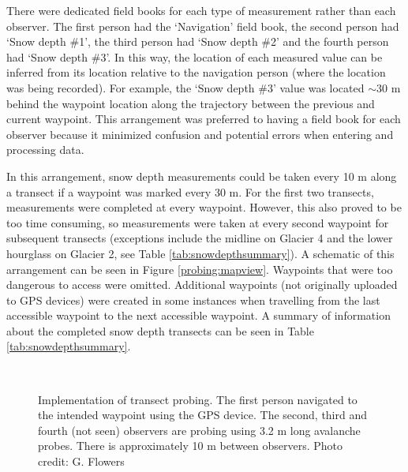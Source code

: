 \documentclass{sfuthesis}
\begin{document}
There were dedicated field books for each type of measurement rather than each observer. The first person had the `Navigation' field book, the second person had `Snow depth \#1', the third person had `Snow depth \#2' and the fourth person had `Snow depth \#3'. In this way, the location of each measured value can be inferred from its location relative to the navigation person (where the location was being recorded). For example, the `Snow depth \#3' value was located $\sim$30 m behind the waypoint location along the trajectory between the previous and current waypoint. This arrangement was preferred to having a field book for each observer because it minimized confusion and potential errors when entering and processing data.

In this arrangement, snow depth measurements could be taken every 10 m along a transect if a waypoint was marked every 30 m. For the first two transects, measurements were completed at every waypoint. However, this also proved to be too time consuming, so measurements were taken at every second waypoint for subsequent transects (exceptions include the midline on Glacier 4 and the lower hourglass on Glacier 2, see Table \ref{tab:snowdepthsummary}). A schematic of this arrangement can be seen in Figure \ref{probing:mapview}. Waypoints that were too dangerous to access were omitted. Additional waypoints (not originally uploaded to GPS devices) were created in some instances when travelling from the last accessible waypoint to the next accessible waypoint. A summary of information about the completed snow depth transects can be seen in Table \ref{tab:snowdepthsummary}.

\begin{figure}[H]
	\centering
	\\
	\caption{Implementation of transect probing. The first person navigated to the intended waypoint using the GPS device. The second, third and fourth (not seen) observers are probing using 3.2 m long avalanche probes. There is approximately 10 m between observers. Photo credit: G. Flowers}
	\label{photo_probing}
	\end{figure}
\end{document}
